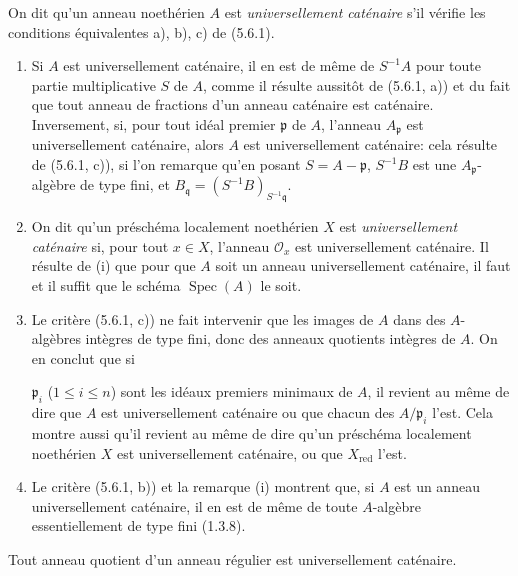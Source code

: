 \begin{definition}[5.6.2]
\label{IV.2.s5.6.2-fr}
On dit qu'un anneau noethérien $A$ est \emph{universellement caténaire} s'il
vérifie les conditions équivalentes a), b), c) de (5.6.1).
\end{definition}

\begin{remarks}[5.6.3]
\label{IV.2.s5.6.3-fr}
\begin{enumerate}
\item[(i)] Si $A$ est universellement caténaire, il en est de même de
$S^{-1}A$ pour toute partie multiplicative $S$ de $A$, comme il résulte
aussitôt de (5.6.1, a)) et du fait que tout anneau de fractions d'un anneau
caténaire est caténaire. Inversement, si, pour tout idéal premier
$\mathfrak p$ de $A$, l'anneau $A_{\mathfrak p}$ est universellement
caténaire, alors $A$ est universellement caténaire: cela résulte de
(5.6.1, c)), si l'on remarque qu'en posant $S=A-\mathfrak p$, $S^{-1}B$
est une $A_{\mathfrak p}$-algèbre de type fini, et
$B_{\mathfrak q}=(S^{-1}B)_{S^{-1}\mathfrak q}$.
\item[(ii)] On dit qu'un préschéma localement noethérien $X$ est
\emph{universellement caténaire} si, pour tout $x\in X$, l'anneau
$\mathcal O_x$ est universellement caténaire. Il résulte de (i) que pour que
$A$ soit un anneau universellement caténaire, il faut et il suffit que le
schéma $\operatorname{Spec}(A)$ le soit.
\item[(iii)] Le critère (5.6.1, c)) ne fait intervenir que les images de $A$
dans des $A$-algèbres intègres de type fini, donc des anneaux quotients
intègres de $A$. On en conclut que si


$\mathfrak p_i$ ($1\leq i\leq n$) sont les idéaux premiers minimaux de $A$,
il revient au même de dire que $A$ est universellement caténaire ou que
chacun des $A/\mathfrak p_i$ l'est. Cela montre aussi qu'il revient au même
de dire qu'un préschéma localement noethérien $X$ est universellement
caténaire, ou que $X_{\mathrm{red}}$ l'est.
\item[(iv)] Le critère (5.6.1, b)) et la remarque (i) montrent que, si $A$
est un anneau universellement caténaire, il en est de même de toute
$A$-algèbre essentiellement de type fini (1.3.8).
\end{enumerate}
\end{remarks}

\begin{proposition}[5.6.4]
\label{IV.2.s5.6.4-fr}
Tout anneau quotient d'un anneau régulier est universellement caténaire.
\end{proposition}

